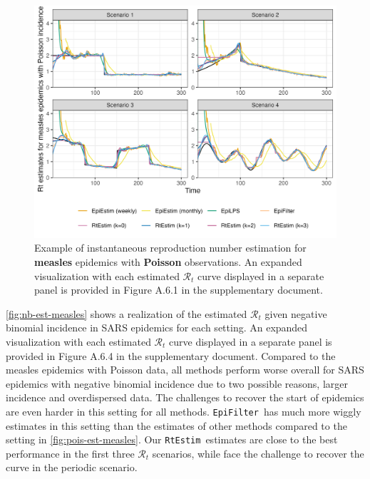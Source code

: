 \documentclass[10pt,letterpaper]{article}
\def\RtEstim{\texttt{RtEstim}}
\def\EpiEstim{\texttt{EpiEstim}}
\def\EpiFilter{\texttt{EpiFilter}}
\def\calR{\mathcal{R}}
\begin{document}
\begin{figure}[!ht]
  \centering
  \includegraphics[width=.99\textwidth]{fig/fig_res_pois_measles.png}
  \caption{Example of instantaneous reproduction number estimation for \textbf{measles} 
    epidemics with \textbf{Poisson} observations. An expanded visualization with each estimated 
    $\calR_t$ curve displayed in a separate panel is provided in Figure A.6.1 
    in the supplementary document.}
  \label{fig:pois-est-measles}
\end{figure}

\autoref{fig:nb-est-measles} shows a realization of the estimated $\calR_t$ given
negative binomial incidence in SARS epidemics for each setting. An expanded 
visualization with each estimated $\calR_t$ curve displayed in a separate panel is 
provided in Figure A.6.4 in the supplementary document. Compared to the measles epidemics 
with Poisson data, all methods perform worse overall for SARS epidemics with negative 
binomial incidence due to two possible reasons, larger incidence and overdispersed data. 
The challenges to recover the start of epidemics are even harder in this setting for 
all methods. \EpiFilter\ has much more wiggly estimates in this setting than the estimates of other 
methods compared to the setting in \autoref{fig:pois-est-measles}. Our \RtEstim\ 
estimates are close to the best performance in the first three $\calR_t$ scenarios, 
while face the challenge to recover the curve in the periodic scenario. 

\end{document}
